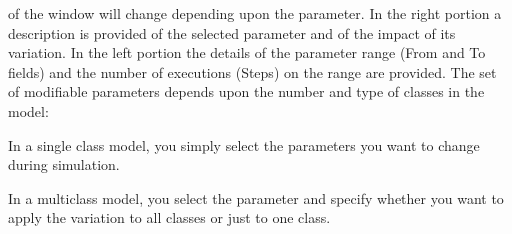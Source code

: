 \begin{description*}
of the window will change depending upon the parameter. In the
right portion a description is provided of the selected parameter
and of the impact of its variation. In the left portion the
details of the parameter range (From and To fields) and the number
of executions (Steps) on the range are provided. The set of
modifiable parameters depends upon the number and type of classes
in the model:
\begin{itemize*}
\item In a single class model, you simply select the parameters you want to change during simulation.
\item In a multiclass model, you select the parameter and specify whether you want to apply the variation to all classes or just to one class.
\end{itemize*}


\end{description*}
